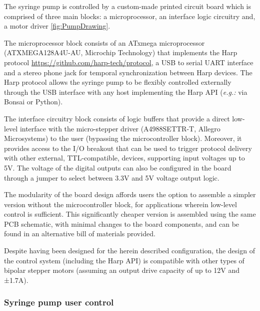 The syringe pump is controlled by a custom-made printed circuit board which is comprised of three main blocks: a microprocessor, an interface logic circuitry and, a motor driver \ref{fig:PumpDrawing}.

The microprocessor block consists of an ATxmega microprocessor (ATXMEGA128A4U-AU, Microchip Technology) that implements the Harp protocol \url{https://github.com/harp-tech/protocol}, a USB to serial UART interface and a stereo phone jack for temporal synchronization between Harp devices. The Harp protocol allows the syringe pump to be flexibly controlled externally through the USB interface with any host implementing the Harp API (\textit{e.g.:} via Bonsai\citep{Lopes2015} or Python).

The interface circuitry block consists of logic buffers that provide a direct low-level interface with the micro-stepper driver (A4988SETTR-T, Allegro Microsystems) to the user (bypassing the microcontroller block). Moreover, it provides access to the I/O breakout that can be used to trigger protocol delivery with other external, TTL-compatible, devices, supporting input voltages up to 5V. The voltage of the digital outputs can also be configured in the board through a jumper to select between 3.3V and 5V voltage output logic.

The modularity of the board design affords users the option to assemble a simpler version without the microcontroller block, for applications wherein low-level control is sufficient. This significantly cheaper version is assembled using the same PCB schematic, with minimal changes to the board components, and can be found in an alternative bill of materials provided.

Despite having been designed for the herein described configuration, the design of the control system (including the Harp API) is compatible with other types of bipolar stepper motors (assuming an output drive capacity of up to 12V and ±1.7A).

\subsubsection*{Syringe pump user control}

